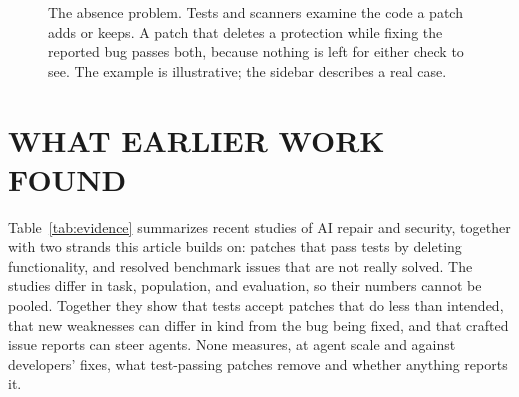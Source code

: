 \documentclass[10pt,journal,compsoc]{IEEEtran}
\newcommand{\mgsection}[1]{\section*{\MakeUppercase{#1}}}
\begin{document}
\begin{figure}[t]
{%
}
\caption{The absence problem. Tests and scanners examine the code a patch adds
or keeps. A patch that deletes a protection while fixing the reported bug passes
both, because nothing is left for either check to see. The example is
illustrative; the sidebar describes a real case.}
\label{fig:concept}
\end{figure}

\mgsection{What earlier work found}

Table~\ref{tab:evidence} summarizes recent studies of AI repair and security,
together with two strands this article builds on: patches that pass tests by
deleting functionality,\cite{qi2015plausibility} and resolved benchmark issues
that are not really solved.\cite{wang2026solved,aleithan2024swebenchplus} The
studies differ in task, population, and evaluation, so their numbers cannot be
pooled. Together they show that tests accept patches that do less than intended,
that new weaknesses can differ in kind from the bug being fixed, and that
crafted issue reports can steer agents. None measures, at agent scale and
against developers' fixes, what test-passing patches remove and whether
anything reports it.
\end{document}

